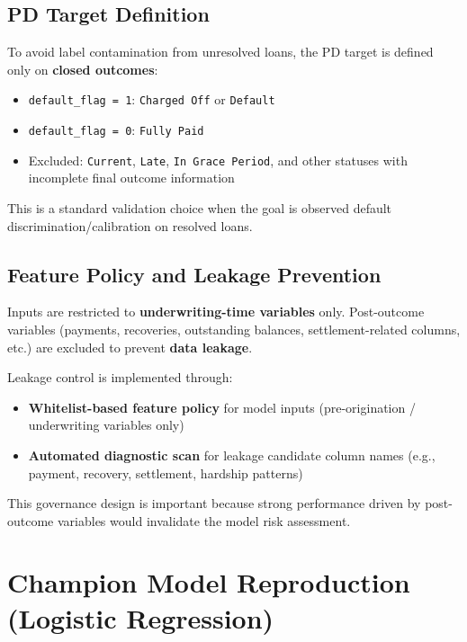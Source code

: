 \documentclass[11pt,a4paper]{article}
\begin{document}
\subsection{PD Target Definition}
To avoid label contamination from unresolved loans, the PD target is defined only on \textbf{closed outcomes}:
\begin{itemize}[leftmargin=*, itemsep=0.25em]
\item \texttt{default\_flag = 1}: \texttt{Charged Off} or \texttt{Default}
\item \texttt{default\_flag = 0}: \texttt{Fully Paid}
\item Excluded: \texttt{Current}, \texttt{Late}, \texttt{In Grace Period}, and other statuses with incomplete final outcome information
\end{itemize}
This is a standard validation choice when the goal is observed default discrimination/calibration on resolved loans.

\subsection{Feature Policy and Leakage Prevention}
Inputs are restricted to \textbf{underwriting-time variables} only. Post-outcome variables (payments, recoveries, outstanding balances, settlement-related columns, etc.) are excluded to prevent \textbf{data leakage}.

Leakage control is implemented through:
\begin{itemize}[leftmargin=*, itemsep=0.25em]
\item \textbf{Whitelist-based feature policy} for model inputs (pre-origination / underwriting variables only)
\item \textbf{Automated diagnostic scan} for leakage candidate column names (e.g., payment, recovery, settlement, hardship patterns)
\end{itemize}

This governance design is important because strong performance driven by post-outcome variables would invalidate the model risk assessment.

\section{Champion Model Reproduction (Logistic Regression)}
\end{document}
